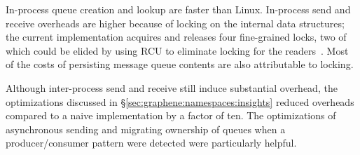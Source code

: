 In-process queue creation and lookup are faster than Linux.
In-process send and receive overheads are higher
because of locking on the internal data structures; the current implementation acquires and releases four
fine-grained locks, two of which could be elided by using RCU to eliminate locking for the readers~\cite{mckenney04rcu}.
Most of the costs of persisting message queue contents are also attributable to locking.

Although inter-process send and receive still induce substantial overhead, the optimizations
discussed in \S\ref{sec:graphene:namespaces:insights} reduced overheads compared to a naive implementation
by a factor of ten.  The optimizations of asynchronous sending and migrating ownership of queues
when a producer/consumer pattern were detected were particularly helpful.



